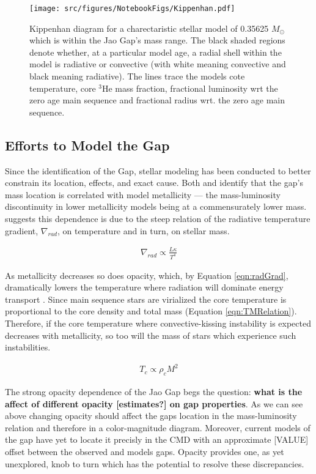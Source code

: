 \begin{figure*}
	\centering
	\texttt{[image: src/figures/NotebookFigs/Kippenhan.pdf]}
	\caption{Kippenhan diagram for a charectaristic stellar model of 0.35625
	$M_{\odot}$ which is within the Jao Gap's mass range. The black shaded
	regions denote whether, at a particular model age, a radial shell within
	the model is radiative or convective (with white meaning convective and
	black meaning radiative). The lines trace the models cote temperature, core
	$^{3}$He mass fraction, fractional luminosity wrt the zero age main
	sequence and fractional radius wrt. the zero age main sequence.}
	\label{fig:Kippenhan1}
\end{figure*}


\subsection{Efforts to Model the Gap}
Since the identification of the Gap, stellar modeling has been
conducted to better constrain its location, effects, and exact cause.
Both \citet{Mansfield2021} and \citet{Feiden2021} identify that the gap's mass
location is correlated with model metallicity --- the mass-luminosity
discontinuity in lower metallicity models being at a commensurately lower mass.
\citet{Feiden2021} suggests this dependence is due to the steep relation of
the radiative temperature gradient, $\nabla_{rad}$, on temperature and in turn,
on stellar mass.

\begin{align}\label{eqn:radGrad}
	\nabla_{rad} \propto \frac{L\kappa}{T^{4}}
\end{align}

As metallicity decreases so does opacity, which, by Equation \ref{eqn:radGrad},
dramatically lowers the temperature where radiation will dominate energy transport
\citep{Chabrier1997}. Since main sequence stars are virialized the core
temperature is proportional to the core density and total mass (Equation
\ref{eqn:TMRelation}). Therefore, if the core temperature where
convective-kissing instability is expected decreases with metallicity, so too
will the mass of stars which experience such instabilities.

\begin{align}\label{eqn:TMRelation}
	T_{c} \propto \rho_{c}M^{2}
\end{align}

The strong opacity dependence of the Jao Gap begs the question: \textbf{what is
the affect of different opacity {\color{red} [estimates?]} on gap properties}.
As we can see above changing opacity should affect the gaps location in the
mass-luminosity relation and therefore in a color-magnitude diagram. Moreover,
current models of the gap have yet to locate it precisly in the CMD
\citep{Feiden2021} with an approximate {\color{red} [VALUE]} offset between the
observed and models gaps. Opacity provides one, as yet unexplored, knob to turn
which has the potential to resolve these discrepancies.
